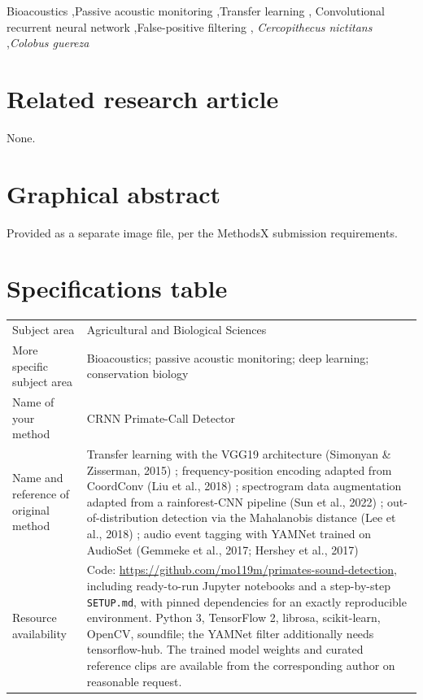 \documentclass[review,3p,times]{elsarticle}
\begin{document}
\begin{frontmatter}
\begin{keyword}
Bioacoustics \sep Passive acoustic monitoring \sep Transfer learning \sep
Convolutional recurrent neural network \sep False-positive filtering \sep
\textit{Cercopithecus nictitans} \sep \textit{Colobus guereza}
\end{keyword}

\end{frontmatter}

\section*{Related research article}
None.

\section*{Graphical abstract}
Provided as a separate image file, per the MethodsX submission requirements.

\section*{Specifications table}

\noindent
\renewcommand{\arraystretch}{1.3}
\begin{tabularx}{\linewidth}{@{}lX@{}}
\toprule
Subject area & Agricultural and Biological Sciences \\
More specific subject area & Bioacoustics; passive acoustic monitoring;
deep learning; conservation biology \\
Name of your method & CRNN Primate-Call Detector \\
Name and reference of original method & Transfer learning with the VGG19
architecture (Simonyan \& Zisserman, 2015) \cite{simonyan2015}; frequency-position
encoding adapted from CoordConv (Liu et al., 2018) \cite{liu2018}; spectrogram
data augmentation adapted from a rainforest-CNN pipeline (Sun et al., 2022)
\cite{sun2022}; out-of-distribution detection via the Mahalanobis distance
(Lee et al., 2018) \cite{lee2018}; audio event tagging with YAMNet trained on
AudioSet (Gemmeke et al., 2017; Hershey et al., 2017) \cite{gemmeke2017,hershey2017} \\
Resource availability & Code:
\url{https://github.com/mo119m/primates-sound-detection}, including
ready-to-run Jupyter notebooks and a step-by-step \texttt{SETUP.md}, with
pinned dependencies for an exactly reproducible environment. Python 3,
TensorFlow 2, librosa, scikit-learn, OpenCV, soundfile; the YAMNet filter
additionally needs tensorflow-hub. The trained model weights and curated
reference clips are available from the corresponding author on reasonable
request. \\
\bottomrule
\end{tabularx}
\end{document}
